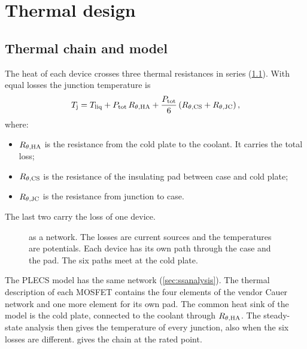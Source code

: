 \chapter{Thermal design}
\label{ch:thermal}

\section{Thermal chain and model}

The heat of each device crosses three thermal resistances in series
(\cref{fig:thermalnet}). With equal losses the junction temperature is
%
\begin{equation}
  T_{\mathrm{j}} = T_\mathrm{liq}
      + P_\mathrm{tot}\,R_{\theta,\mathrm{HA}}
      + \frac{P_\mathrm{tot}}{6}\left(R_{\theta,\mathrm{CS}} + R_{\theta,\mathrm{JC}}\right),
  \label{eq:thermal-chain}
\end{equation}
%
where:
\begin{itemize}
  \item $R_{\theta,\mathrm{HA}}$ is the resistance from the cold plate to the coolant. It
        carries the total loss;
  \item $R_{\theta,\mathrm{CS}}$ is the resistance of the insulating pad between case and
        cold plate;
  \item $R_{\theta,\mathrm{JC}}$ is the resistance from junction to case.
\end{itemize}
The last two carry the loss of one device.

\begin{figure}[H]
\centering

\caption{ as a network. The losses are current sources
and the temperatures are potentials. Each device has its own path through
the case and the pad. The six paths meet at the cold plate.}
\label{fig:thermalnet}
\end{figure}

The PLECS model has the same network (\cref{sec:ssanalysis}). The thermal
description of each MOSFET contains the four elements of the vendor Cauer
network and one more element for its own pad. The common heat sink of the
model is the cold plate, connected to the coolant through $R_{\theta,\mathrm{HA}}$. The
steady-state analysis then gives the temperature of every junction, also
when the six losses are different.  gives the chain
at the rated point.

